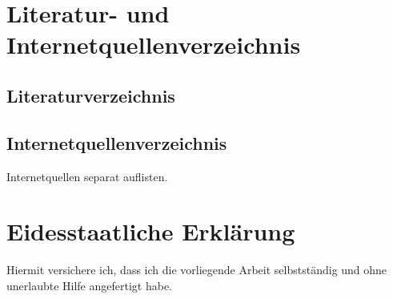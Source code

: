 \documentclass[12pt, a4paper, oneside]{article}
\begin{document}
	\newpage
	\section{Literatur- und Internetquellenverzeichnis}
	\subsection{Literaturverzeichnis}
	
	\subsection{Internetquellenverzeichnis}
	Internetquellen separat auflisten.
	
	\newpage
	\section*{Eidesstaatliche Erklärung}
	Hiermit versichere ich, dass ich die vorliegende Arbeit selbstständig und ohne unerlaubte Hilfe angefertigt habe.
	
\end{document}
